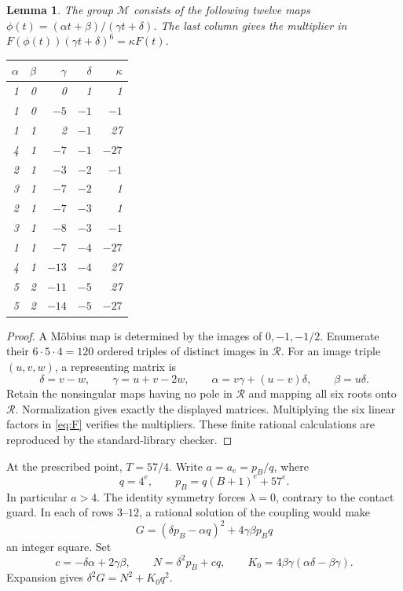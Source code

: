\documentclass[11pt,a4paper]{article}
\newtheorem{lemma}[theorem]{Lemma}
\begin{document}
\begin{lemma}\label{lem:menu}
The group $\mathcal M$ consists of the following twelve maps
$\phi(t)=(\alpha t+\beta)/(\gamma t+\delta)$.
The last column gives the multiplier in
$F(\phi(t))(\gamma t+\delta)^6=\kappa F(t)$.
\begin{center}
\begin{tabular}{rrrrr}\toprule
$\alpha$&$\beta$&$\gamma$&$\delta$&$\kappa$\\\midrule
1&0&0&1&1\\
1&0&$-5$&$-1$&$-1$\\
1&1&2&$-1$&27\\
4&1&$-7$&$-1$&$-27$\\
2&1&$-3$&$-2$&$-1$\\
3&1&$-7$&$-2$&1\\
2&1&$-7$&$-3$&1\\
3&1&$-8$&$-3$&$-1$\\
1&1&$-7$&$-4$&$-27$\\
4&1&$-13$&$-4$&27\\
5&2&$-11$&$-5$&27\\
5&2&$-14$&$-5$&$-27$\\\bottomrule
\end{tabular}
\end{center}
\end{lemma}
\begin{proof}
A M\"obius map is determined by the images of $0,-1,-1/2$.
Enumerate their $6\cdot5\cdot4=120$ ordered triples of distinct
images in $\mathcal R$. For an image triple $(u,v,w)$, a representing
matrix is
\[
 \delta=v-w,\qquad \gamma=u+v-2w,\qquad
 \alpha=v\gamma+(u-v)\delta,\qquad \beta=u\delta.
\]
Retain the nonsingular maps having no pole in $\mathcal R$ and
mapping all six roots onto $\mathcal R$. Normalization gives exactly
the displayed matrices. Multiplying the six linear factors in
\eqref{eq:F} verifies the multipliers. These finite rational
calculations are reproduced by the standard-library checker.
\end{proof}

At the prescribed point, $T=57/4$. Write $a=a_e=p_B/q$, where
\begin{equation}\label{eq:scale}
              q=4^e,\qquad p_B=q(B+1)^e+57^e.
\end{equation}
In particular $a>4$. The identity symmetry forces $\lambda=0$,
contrary to the contact guard. In each of rows $3$--$12$, a rational
solution of the coupling would make
\[
                  G=(\delta p_B-\alpha q)^2+4\gamma\beta p_Bq
\]
an integer square. Set
\begin{equation}\label{eq:gapdefinitions}
 c=-\delta\alpha+2\gamma\beta,\qquad
 N=\delta^2p_B+cq,\qquad
 K_0=4\beta\gamma(\alpha\delta-\beta\gamma).
\end{equation}
Expansion gives $\delta^2G=N^2+K_0q^2$.
\end{document}
